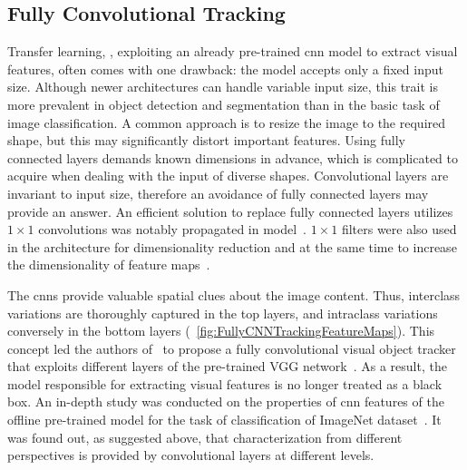 \subsection{Fully Convolutional Tracking}
\label{ssec:FullyConvolutionalTracking}

Transfer learning, \egtext{}, exploiting an already pre-trained \gls{cnn} model to extract visual features, often comes with one drawback: the model accepts only a fixed input size. Although newer architectures can handle variable input size, this trait is more prevalent in object detection and segmentation than in the basic task of image classification. A common approach is to resize the image to the required shape, but this may significantly distort important features. Using fully connected layers demands known dimensions in advance, which is complicated to acquire when dealing with the input of diverse shapes. Convolutional layers are invariant to input size, therefore an avoidance of fully connected layers may provide an answer. An efficient solution to replace fully connected layers utilizes $1 \times 1$ convolutions was notably propagated in  model~\cite{lin2014netinnet}. $1 \times 1$ filters were also used in the  architecture for dimensionality reduction and at the same time to increase the dimensionality of feature maps~\cite{szegedy2015inception}.

The \glspl{cnn} provide valuable spatial clues about the image content. Thus, interclass variations are thoroughly captured in the top layers, and intraclass variations conversely in the bottom layers (\figtext{}~\ref{fig:FullyCNNTrackingFeatureMaps}). This concept led the authors of~\cite{wang2015votcnn} to propose a fully convolutional visual object tracker that exploits different layers of the pre-trained VGG network~\cite{simonyan2015verydeepcnn}. As a result, the model responsible for extracting visual features is no longer treated as a black box. An in-depth study was conducted on the properties of \gls{cnn} features of the offline pre-trained model for the task of classification of ImageNet dataset~\cite{deng2009imagenet}. It was found out, as suggested above, that characterization from different perspectives is provided by convolutional layers at different levels.

